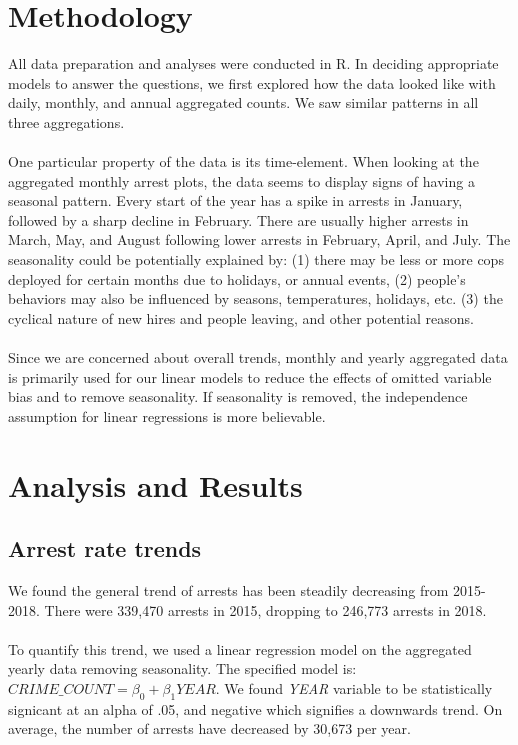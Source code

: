 \documentclass[11pt]{article}\usepackage[]{graphicx}\usepackage[]{color}
\begin{document}
\section{Methodology}
All data preparation and analyses were conducted in R. In deciding appropriate models to answer the questions, we first explored how the data looked like with daily, monthly, and annual aggregated counts. We saw similar patterns in all three aggregations.
\\\\
One particular property of the data is its time-element. When looking at the aggregated monthly arrest plots, the data seems to display signs of having a seasonal pattern. Every start of the year has a spike in arrests in January, followed by a sharp decline in February. There are usually higher arrests in March, May, and August following lower arrests in February, April, and July. The seasonality could be potentially explained by: (1) there may be less or more cops deployed for certain months due to holidays, or annual events, (2) people's behaviors may also be influenced by seasons, temperatures, holidays, etc. (3) the cyclical nature of new hires and people leaving, and other potential reasons. 
\\\\
Since we are concerned about overall trends, monthly and yearly aggregated data is primarily used for our linear models to reduce the effects of omitted variable bias and to remove seasonality. If seasonality is removed, the independence assumption for linear regressions is more believable.

\section{Analysis and Results}
\subsection{Arrest rate trends}
We found the general trend of arrests has been steadily decreasing from 2015-2018. There were 339,470 arrests in 2015, dropping to 246,773 arrests in 2018. 
\\\\
To quantify this trend, we used a linear regression model on the aggregated yearly data removing seasonality. The specified model is: $CRIME\_COUNT=\beta_0+\beta_1YEAR$. We found \textit{YEAR} variable to be statistically signicant at an alpha of .05, and negative which signifies a downwards trend. On average, the number of arrests have decreased by 30,673 per year.
\end{document}
